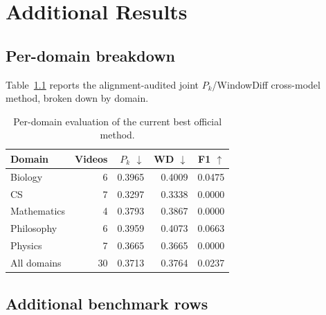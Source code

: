 \chapter{Additional Results}
\label{app:extra}

\section{Per-domain breakdown}
\label{app:per_domain}

Table~\ref{tab:domain_breakdown} reports the alignment-audited joint
$P_k$/WindowDiff cross-model method, broken down by domain.

\begin{table}[h]
  \centering
  \caption{Per-domain evaluation of the current best official method.}
  \label{tab:domain_breakdown}
  \small
  \begin{tabular}{lrrrr}
    \toprule
    Domain & Videos & $P_k$ $\downarrow$ & WD $\downarrow$ & F1 $\uparrow$ \\
    \midrule
    Biology & 6 & 0.3965 & 0.4009 & 0.0475 \\
    CS & 7 & 0.3297 & 0.3338 & 0.0000 \\
    Mathematics & 4 & 0.3793 & 0.3867 & 0.0000 \\
    Philosophy & 6 & 0.3959 & 0.4073 & 0.0663 \\
    Physics & 7 & 0.3665 & 0.3665 & 0.0000 \\
    \midrule
    All domains & 30 & 0.3713 & 0.3764 & 0.0237 \\
    \bottomrule
  \end{tabular}
\end{table}

\section{Additional benchmark rows}
\label{app:additional_benchmarks}


